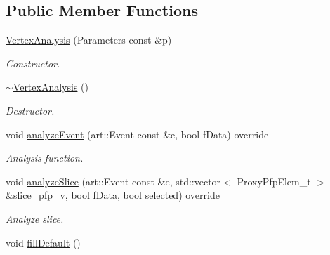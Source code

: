 \subsection*{Public Member Functions}
\begin{DoxyCompactItemize}
\item 
\hyperlink{classanalysis_1_1VertexAnalysis_aaccb156611e2103e3d7b3eccda96e776}{Vertex\+Analysis} (Parameters const \&p)
\begin{DoxyCompactList}\small\item\em Constructor. \end{DoxyCompactList}\item 
\hyperlink{classanalysis_1_1VertexAnalysis_a51614fa76833ac450a25cc59d57b602e}{$\sim$\+Vertex\+Analysis} ()\hypertarget{classanalysis_1_1VertexAnalysis_a51614fa76833ac450a25cc59d57b602e}{}\label{classanalysis_1_1VertexAnalysis_a51614fa76833ac450a25cc59d57b602e}

\begin{DoxyCompactList}\small\item\em Destructor. \end{DoxyCompactList}\item 
void \hyperlink{classanalysis_1_1VertexAnalysis_ae5786ee30fa27f1e353d2f4be8d87303}{analyze\+Event} (art\+::\+Event const \&e, bool f\+Data) override\hypertarget{classanalysis_1_1VertexAnalysis_ae5786ee30fa27f1e353d2f4be8d87303}{}\label{classanalysis_1_1VertexAnalysis_ae5786ee30fa27f1e353d2f4be8d87303}

\begin{DoxyCompactList}\small\item\em Analysis function. \end{DoxyCompactList}\item 
void \hyperlink{classanalysis_1_1VertexAnalysis_a92a04f287cdc090fb83431f02882cb20}{analyze\+Slice} (art\+::\+Event const \&e, std\+::vector$<$ Proxy\+Pfp\+Elem\+\_\+t $>$ \&slice\+\_\+pfp\+\_\+v, bool f\+Data, bool selected) override\hypertarget{classanalysis_1_1VertexAnalysis_a92a04f287cdc090fb83431f02882cb20}{}\label{classanalysis_1_1VertexAnalysis_a92a04f287cdc090fb83431f02882cb20}

\begin{DoxyCompactList}\small\item\em Analyze slice. \end{DoxyCompactList}\item 
void \hyperlink{classanalysis_1_1VertexAnalysis_a783ba09d780bff0f2bb0b9721571503a}{fill\+Default} ()\hypertarget{classanalysis_1_1VertexAnalysis_a783ba09d780bff0f2bb0b9721571503a}{}\label{classanalysis_1_1VertexAnalysis_a783ba09d780bff0f2bb0b9721571503a}


\end{DoxyCompactItemize}

